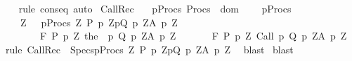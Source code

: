 \begin{isabellebody}
%
\isadelimproof
\ \ %
\endisadelimproof
%
\isatagproof
{}\isamarkupfalse%
\ {\isacharparenleft}rule\ conseq{\isacharparenright}\ auto%
\endisatagproof
{\isafoldproof}%
%
\isadelimproof
\isanewline
%
\endisadelimproof
\isanewline
\isanewline
{}\isamarkupfalse%
\ CallRec{\isacharprime}{\isacharcolon}\ \isanewline
\ \ {\isachardoublequoteopen}{\isasymlbrakk}p{\isasymin}Procs{\isacharsemicolon}\ Procs\ {\isasymsubseteq}\ dom\ {\isasymGamma}{\isacharsemicolon}\isanewline
\ \ \ {\isasymforall}p{\isasymin}Procs{\isachardot}\ \isanewline
\ \ \ \ {\isasymforall}Z{\isachardot}\ {\isasymGamma}{\isacharcomma}{\isasymTheta}\ {\isasymunion}\ {\isacharparenleft}{\isasymUnion}p{\isasymin}Procs{\isachardot}\ {\isasymUnion}Z{\isachardot}\ {\isacharbraceleft}{\isacharparenleft}{\isacharparenleft}P\ p\ Z{\isacharparenright}{\isacharcomma}p{\isacharcomma}Q\ p\ Z{\isacharcomma}A\ p\ Z{\isacharparenright}{\isacharbraceright}{\isacharparenright}\isanewline
\ \ \ \ \ \ \ \ {\isasymturnstile}\isactrlbsub {\isacharslash}F\isactrlesub \ {\isacharparenleft}P\ p\ Z{\isacharparenright}\ {\isacharparenleft}the\ {\isacharparenleft}{\isasymGamma}\ p{\isacharparenright}{\isacharparenright}\ {\isacharparenleft}Q\ p\ Z{\isacharparenright}{\isacharcomma}{\isacharparenleft}A\ p\ Z{\isacharparenright}{\isasymrbrakk}\isanewline
\ \ \ {\isasymLongrightarrow}\isanewline
\ \ \ {\isasymGamma}{\isacharcomma}{\isasymTheta}{\isasymturnstile}\isactrlbsub {\isacharslash}F\isactrlesub \ {\isacharparenleft}P\ p\ Z{\isacharparenright}\ {\isacharparenleft}Call\ p{\isacharparenright}\ {\isacharparenleft}Q\ p\ Z{\isacharparenright}{\isacharcomma}{\isacharparenleft}A\ p\ Z{\isacharparenright}{\isachardoublequoteclose}\isanewline
%
\isadelimproof
%
\endisadelimproof
%
\isatagproof
{}\isamarkupfalse%
\ {\isacharparenleft}rule\ CallRec\ {\isacharbrackleft}\ Specs{\isacharequal}{\isachardoublequoteopen}{\isasymUnion}p{\isasymin}Procs{\isachardot}\ {\isasymUnion}Z{\isachardot}\ {\isacharbraceleft}{\isacharparenleft}{\isacharparenleft}P\ p\ Z{\isacharparenright}{\isacharcomma}p{\isacharcomma}Q\ p\ Z{\isacharcomma}A\ p\ Z{\isacharparenright}{\isacharbraceright}{\isachardoublequoteclose}{\isacharbrackright}{\isacharparenright}\isanewline
{}\isamarkupfalse%
\ \ blast\isanewline
{}\isamarkupfalse%
\ blast\isanewline
{}\isamarkupfalse%
%
\endisatagproof
{\isafoldproof}%
%
\isadelimproof
\isanewline
%
\endisadelimproof
%
\isadelimtheory
\isanewline
%
\endisadelimtheory
%
\isatagtheory
{}\isamarkupfalse%
%
\endisatagtheory
{\isafoldtheory}%
%
\isadelimtheory
%
\endisadelimtheory
%
\end{isabellebody}%
